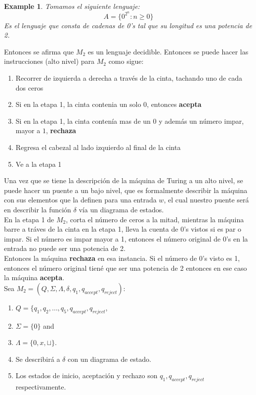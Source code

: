 \documentclass[10pt]{report}
\newtheorem{example}{Example}
\begin{document}
    \begin{example}
        Tomamos el siguiente lenguaje:
        \begin{equation}
            A = \{ 0^2^n : n\geq 0 \}\label{eq:equation2}
        \end{equation}
        Es el lenguaje que consta de cadenas de 0's tal que su longitud es una
        potencia de 2.
    \end{example}
    Entonces se afirma que $M_{2}$ es un lenguaje decidible.
    Entonces se puede hacer las instrucciones (alto  nivel) para $M_{2}$ como sigue:
    \begin{enumerate}
        \item Recorrer de izquierda a derecha a través de la cinta, tachando uno de cada dos ceros
        \item Si en la etapa 1, la cinta contenia un solo $0$, entonces \textbf{acepta}
        \item Si en la etapa 1, la cinta contenía mas de un $0$ y además un número impar, mayor a $1$, \textbf{rechaza}
        \item Regresa el cabezal al lado izquierdo al final de la cinta
        \item Ve a la etapa 1
    \end{enumerate}
    Una vez que se tiene la descripción de la máquina de Turing a un alto nivel, se puede hacer un puente
    a un bajo nivel, que es formalmente describir la máquina con sus elementos que la definen para una entrada $w$,
    el cual nuestro puente será en describir la función $\delta$ vía un diagrama de estados.\\

    En la etapa 1 de $M_{2}$, corta el número de ceros a la mitad, mientras la máquina barre a tráves de la cinta en la
    etapa 1, lleva la cuenta de $0$'s vistos si es par o impar.\newline
    Si el número es impar mayor a 1, entonces el número original
    de $0$'s en la entrada no puede ser una potencia de 2.\\
    Entonces la máquina \textbf{rechaza} en esa instancia.
    Si el número de 0's visto es 1, entonces el número original tiené que ser una potencia de 2 entonces en ese
    caso la máquina \textbf{acepta}.\\

    Sea $M_{2} =(Q,\Sigma,\Lambda,\delta,q_{1},q_{accept},q_{reject})$:
    \begin{enumerate}
        \item $Q = \{q_{1},q_{2},\dots,q_{5},q_{accept},q_{reject}$,
        \item $\Sigma = \{ 0 \}$ and
        \item $\Lambda = \{0,x,\sqcup \}$.
        \item Se describirá a $\delta$ con un diagrama de estado.
        \item Los estados de inicio, aceptación y rechazo son $q_{1},q_{accept},q_{reject}$ respectivamente.
    \end{enumerate}
\end{document}
